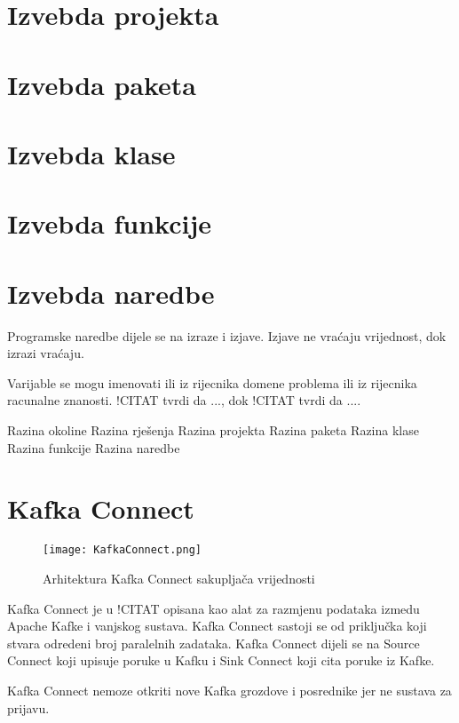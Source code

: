 \documentclass[times, utf8, diplomski, numeric]{fer}
\begin{document}
\section{Izvebda projekta}

\section{Izvebda paketa}

\section{Izvebda klase}

\section{Izvebda funkcije}

\section{Izvebda naredbe}

Programske naredbe dijele se na izraze i izjave. Izjave ne vraćaju vrijednost, dok izrazi vraćaju. 

Varijable se mogu imenovati ili iz rijecnika domene problema ili iz rijecnika racunalne znanosti. !CITAT tvrdi da ..., dok !CITAT tvrdi da ....



Razina okoline
Razina rješenja
Razina projekta
Razina paketa
Razina klase
Razina funkcije
Razina naredbe

\section{Kafka Connect}

\begin{figure}[H]
    \centering
    \texttt{[image: KafkaConnect.png]}
    \caption{Arhitektura Kafka Connect sakupljača vrijednosti}
    \label{fig:kafka-connect}
\end{figure}

Kafka Connect je u !CITAT opisana kao alat za razmjenu podataka izmedu Apache Kafke i vanjskog sustava. Kafka Connect sastoji se od priključka koji stvara odredeni broj paralelnih zadataka. Kafka Connect dijeli se na Source Connect koji upisuje poruke u Kafku i Sink Connect koji cita poruke iz Kafke.

Kafka Connect nemoze otkriti nove Kafka grozdove i posrednike jer ne sustava za prijavu.
\end{document}
